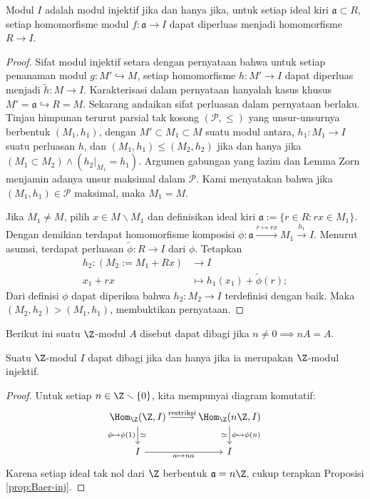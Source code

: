 \begin{proposition}[R.\ Baer]\label{prop:Baer-inj}
	Modul $I$ adalah modul injektif jika dan hanya jika, untuk setiap ideal kiri $\mathfrak{a} \subset R$, setiap homomorfisme modul $f: \mathfrak{a} \to I$ dapat diperluas menjadi homomorfisme $R \to I$.
\end{proposition} 
\begin{proof}
	Sifat modul injektif setara dengan pernyataan bahwa untuk setiap penanaman modul $g: M' \hookrightarrow M$, setiap homomorfisme $h: M' \to I$ dapat diperluas menjadi $\tilde{h}: M \to I$. Karakterisasi dalam pernyataan hanyalah kasus khusus $M' = \mathfrak{a} \hookrightarrow R = M$. Sekarang andaikan sifat perluasan dalam pernyataan berlaku. Tinjau himpunan terurut parsial tak kosong $(\mathcal{P}, \leq)$ yang unsur-unsurnya berbentuk $(M_1, h_1)$, dengan $M' \subset M_1 \subset M$ suatu modul antara, $h_1: M_1 \to I$ suatu perluasan $h$, dan $(M_1, h_1) \leq (M_2, h_2)$ jika dan hanya jika $(M_1 \subset M_2) \wedge (h_2|_{M_1} = h_1)$. Argumen gabungan yang lazim dan Lemma Zorn menjamin adanya unsur maksimal dalam $\mathcal{P}$. Kami menyatakan bahwa jika $(M_1, h_1) \in \mathcal{P}$ maksimal, maka $M_1=M$.
	
	Jika $M_1 \neq M$, pilih $x \in M \smallsetminus M_1$ dan definisikan ideal kiri $\mathfrak{a} := \{r \in R: rx \in M_1 \}$. Dengan demikian terdapat homomorfisme komposisi $\phi: \mathfrak{a} \xrightarrow{r \mapsto rx} M_1 \xrightarrow{h_1} I$. Menurut asumsi, terdapat perluasan $\tilde{\phi}: R \to I$ dari $\phi$. Tetapkan
	\begin{align*}
		h_2: (M_2 := M_1 + Rx) & \longrightarrow I \\
		x_1 + rx & \longmapsto h_1(x_1) + \tilde{\phi}(r);
	\end{align*}
	Dari definisi $\phi$ dapat diperiksa bahwa $h_2: M_2 \to I$ terdefinisi dengan baik. Maka $(M_2, h_2) > (M_1, h_1)$, membuktikan pernyataan.
\end{proof}

Berikut ini suatu $\Z$-modul $A$ disebut dapat dibagi jika $n \neq 0 \implies nA=A$.
\begin{lemma}\label{prop:divisible-injective}
	Suatu $\Z$-modul $I$ dapat dibagi jika dan hanya jika ia merupakan $\Z$-modul injektif.
\end{lemma}
\begin{proof}
	Untuk setiap $n \in \Z \smallsetminus \{0\}$, kita mempunyai diagram komutatif:
	\[\begin{tikzcd}
		\Hom_{\Z}(\Z, I) \arrow[r, "\text{restriksi}"] \arrow[d, "\phi \mapsto \phi(1)"', "\simeq"] & \Hom_{\Z}(n\Z, I) \arrow[d, "\phi \mapsto \phi(n)", "\simeq"'] \\
		I \arrow[r, "a \mapsto na"'] & I
	\end{tikzcd} \]
	Karena setiap ideal tak nol dari $\Z$ berbentuk $\mathfrak{a} = n\Z$, cukup terapkan Proposisi \ref{prop:Baer-inj}.
\end{proof}


